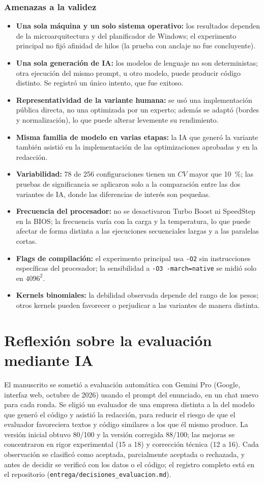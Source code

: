 \documentclass[12pt]{article}
\begin{document}
\subsubsection{Amenazas a la validez}
\begin{itemize}
\item \textbf{Una sola máquina y un solo sistema operativo:} los resultados dependen de la microarquitectura y del planificador de Windows; el experimento principal no fijó afinidad de hilos (la prueba con anclaje no fue concluyente).
\item \textbf{Una sola generación de IA:} los modelos de lenguaje no son deterministas; otra ejecución del mismo prompt, u otro modelo, puede producir código distinto. Se registró un único intento, que fue exitoso.
\item \textbf{Representatividad de la variante humana:} se usó una implementación pública directa, no una optimizada por un experto; además se adaptó (bordes y normalización), lo que puede alterar levemente su rendimiento.
\item \textbf{Misma familia de modelo en varias etapas:} la IA que generó la variante también asistió en la implementación de las optimizaciones aprobadas y en la redacción.
\item \textbf{Variabilidad:} 78 de 256 configuraciones tienen un $CV$ mayor que 10~\%; las pruebas de significancia se aplicaron solo a la comparación entre las dos variantes de IA, donde las diferencias de interés son pequeñas.
\item \textbf{Frecuencia del procesador:} no se desactivaron Turbo Boost ni SpeedStep en la BIOS; la frecuencia varía con la carga y la temperatura, lo que puede afectar de forma distinta a las ejecuciones secuenciales largas y a las paralelas cortas.
\item \textbf{Flags de compilación:} el experimento principal usa \texttt{-O2} sin instrucciones específicas del procesador; la sensibilidad a \texttt{-O3 -march=native} se midió solo en $4096^2$.
\item \textbf{Kernels binomiales:} la debilidad observada depende del rango de los pesos; otros kernels pueden favorecer o perjudicar a las variantes de manera distinta.
\end{itemize}

\section{Reflexión sobre la evaluación mediante IA}
El manuscrito se sometió a evaluación automática con Gemini Pro (Google, interfaz web, octubre de 2026) usando el prompt del enunciado, en un chat nuevo para cada ronda. Se eligió un evaluador de una empresa distinta a la del modelo que generó el código y asistió la redacción, para reducir el riesgo de que el evaluador favoreciera textos y código similares a los que él mismo produce. La versión inicial obtuvo 80/100 y la versión corregida 88/100; las mejoras se concentraron en rigor experimental (15 a 18) y corrección técnica (12 a 16). Cada observación se clasificó como aceptada, parcialmente aceptada o rechazada, y antes de decidir se verificó con los datos o el código; el registro completo está en el repositorio (\texttt{entrega/decisiones\_evaluacion.md}).
\end{document}

